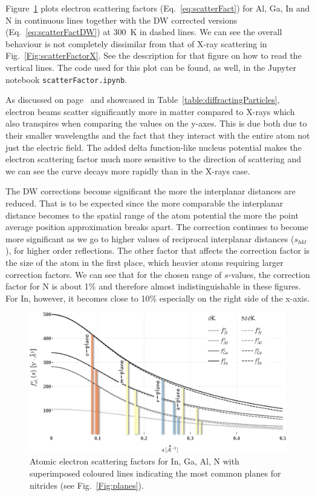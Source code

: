 Figure~\ref{Fig:scatterFactor_e} plots electron scattering factors (Eq.~\ref{eq:scatterFact}) for Al, Ga, In and N in continuous lines together with the DW corrected versions (Eq.~\ref{eq:scatterFactDW}) at \SI{300}{K} in dashed lines. We can see the overall behaviour is not completely dissimilar from that of X-ray scattering in Fig.~\ref{Fig:scatterFactorX}. See the description for that figure on how to read the vertical lines. The code used for this plot can be found, as well, in the Jupyter notebook {\tt scatterFactor.ipynb}. 


As discussed on page~\pageref{table:diffractingParticles} and showcased in Table~\ref{table:diffractingParticles}, electron beams scatter significantly more in matter compared to X-rays which also transpires when comparing the values on the y-axes. This is due both due to their smaller wavelengths and the fact that they interact with the entire atom not just the electric field. The added delta function-like nucleus potential makes the electron scattering factor much more sensitive to the direction of scattering and we can see the curve decays more rapidly than in the X-rays case. 


The DW corrections become significant the more the interplanar distances are reduced. That is to be expected since the more comparable the interplanar distance becomes to the spatial range of the atom potential the more the point average position approximation breaks apart. The correction continues to become more significant as we go to higher values of reciprocal interplanar distances ($s_{hkl}$), \eg for higher order reflections. The other factor that affects the correction factor is the size of the atom in the first place, which heavier atoms requiring larger correction factors. We can see that for the chosen range of $s$-values, the correction factor for N is about 1\% and therefore almost indistinguishable in  these figures. For In, however, it becomes close to 10\% especially on the right side of the x-axis. 


\begin{figure}
    \centering
\includegraphics[width=1\linewidth]{Figures/scatterFactor_ecor.png}
\caption[Atomic electron scattering factors.]{Atomic electron scattering factors for In, Ga, Al, N with superimposed coloured lines indicating the most common planes for nitrides (see Fig.~\ref{Fig:planes}). }
\label{Fig:scatterFactor_e}
\end{figure}

